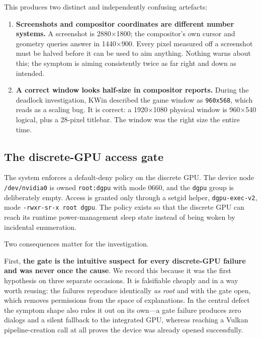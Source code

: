 This produces two distinct and independently confusing artefacts:

\begin{enumerate}
\item \textbf{Screenshots and compositor coordinates are different number
      systems.} A screenshot is 2880$\times$1800; the compositor's own cursor and
      geometry queries answer in 1440$\times$900. Every pixel measured off a
      screenshot must be halved before it can be used to aim anything. Nothing
      warns about this; the symptom is aiming consistently twice as far right and
      down as intended.
\item \textbf{A correct window looks half-size in compositor reports.} During the
      deadlock investigation, KWin described the game window as
      \verb|960x568|, which reads as a scaling bug. It is correct: a
      1920$\times$1080 physical window is 960$\times$540 logical, plus a 28-pixel
      titlebar. The window was the right size the entire time.
\end{enumerate}

\subsection{The discrete-GPU access gate}

The system enforces a default-deny policy on the discrete GPU. The device node
\verb|/dev/nvidia0| is owned \verb|root:dgpu| with mode 0660, and the
\verb|dgpu| group is deliberately empty. Access is granted only through a setgid
helper, \verb|dgpu-exec-v2|, mode \verb|-rwxr-sr-x root dgpu|. The policy exists
so that the discrete GPU can reach its runtime power-management sleep state
instead of being woken by incidental enumeration.

Two consequences matter for the investigation.

First, \textbf{the gate is the intuitive suspect for every discrete-GPU failure
and was never once the cause}. We record this because it was the first
hypothesis on three separate occasions. It is falsifiable cheaply and in a way
worth reusing: the failures reproduce identically \emph{as root} and with the
gate open, which removes permissions from the space of explanations. In the
central defect the symptom shape also rules it out on its own---a gate failure
produces zero dialogs and a silent fallback to the integrated GPU, whereas
reaching a Vulkan pipeline-creation call at all proves the device was already
opened successfully.

